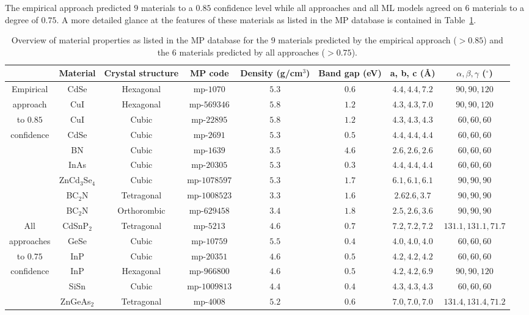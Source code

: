 \documentclass[superscriptaddress,unsortedaddress,
 amsmath,amssymb,
 aps,
]{revtex4-2}
\begin{document}


The empirical approach predicted $9$ materials to a $0.85$ confidence level while all approaches and all ML models agreed on $6$ materials to a degree of $0.75$. 
A more detailed glance at the features of these materials as listed in the MP database is contained in Table~\ref{tab:materialproperties}. 
\begin{table}[t]
    \centering 
    \caption{Overview of material properties as listed in the MP database for the $9$ materials predicted by the empirical approach ($>0.85$) and the $6$ materials predicted by all approaches ($>0.75$). }
    \begin{tabular}{c|c c c c c c c }
      & Material & Crystal structure & MP code & Density (g/cm$^3$) & Band gap (eV) & a, b, c (\AA) & $\alpha,\beta,\gamma$ ($^\circ$) \\
    \hline 
    Empirical & CdSe & Hexagonal & mp-$1070$ & $5.3$ & $0.6$ & $4.4,4.4,7.2$ & $90,90,120$ \\
    approach  & CuI & Hexagonal & mp-$569346$ & $5.8$ & $1.2$ & $4.3,4.3,7.0$ & $90,90,120$ \\ 
    to $0.85$  & CuI & Cubic & mp-$22895$ & $5.8$ & $1.2$ & $4.3,4.3,4.3$ & $60,60,60$  \\ 
    confidence & CdSe & Cubic & mp-$2691$ & $5.3$ & $0.5$ & $4.4,4.4,4.4$ & $60,60,60$  \\
     & BN & Cubic & mp-$1639$ & $3.5$ & $4.6$ & $2.6,2.6,2.6$ & $60,60,60$  \\
     & InAs & Cubic & mp-$20305$ & $5.3$ & $0.3$ & $4.4,4.4,4.4$ & $60,60,60$ \\
     & ZnCd$_3$Se$_4$ & Cubic & mp-$1078597$ & $5.3$ & $1.7$ & $6.1,6.1,6.1$ & $90,90,90$ \\
     & BC$_2$N & Tetragonal & mp-$1008523$ & $3.3$ & $1.6$ & $2.62.6,3.7$ & $90,90,90$ \\
     & BC$_2$N & Orthorombic & mp-$629458$ & $3.4$ & $1.8$ & $2.5,2.6,3.6$ & $90,90,90$ \\
    \hline 
    All & CdSnP$_2$ & Tetragonal & mp-$5213$ & $4.6$ & $0.7$ & $7.2,7.2,7.2$ & $131.1,131.1,71.7$ \\
    approaches & GeSe & Cubic & mp-$10759$ & $5.5$ & $0.4$ & $4.0,4.0,4.0$ & $60,60,60$ \\
    to $0.75$  & InP & Cubic & mp-$20351$ & $4.6$ & $0.5$ & $4.2,4.2,4.2$ &  $60,60,60$\\ 
    confidence & InP & Hexagonal & mp-$966800$ & $4.6$ & $0.5$ & $4.2,4.2,6.9$ & $90,90,120$ \\ 
     & SiSn & Cubic & mp-$1009813$ & $4.4$ & $0.4$ & $4.3,4.3,4.3$ & $60,60,60$ \\
     & ZnGeAs$_2$ & Tetragonal & mp-$4008$ & $5.2$ & $0.6$ & $7.0,7.0,7.0$ & $131.4,131.4,71.2$ \\
    \end{tabular}
    \label{tab:materialproperties}
\end{table}
\end{document}
